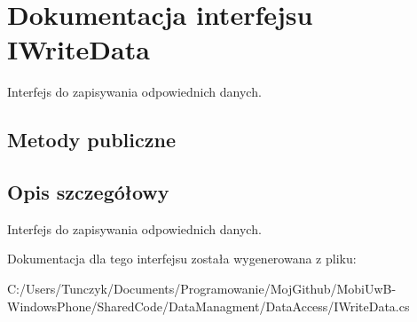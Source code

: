 \hypertarget{a00033}{}\section{Dokumentacja interfejsu I\+Write\+Data}
\label{a00033}


Interfejs do zapisywania odpowiednich danych.  


\subsection*{Metody publiczne}


\subsection{Opis szczegółowy}
Interfejs do zapisywania odpowiednich danych. 



Dokumentacja dla tego interfejsu została wygenerowana z pliku\+:\begin{DoxyCompactItemize}
\item 
C\+:/\+Users/\+Tunczyk/\+Documents/\+Programowanie/\+Moj\+Github/\+Mobi\+Uw\+B-\/\+Windows\+Phone/\+Shared\+Code/\+Data\+Managment/\+Data\+Access/I\+Write\+Data.\+cs\end{DoxyCompactItemize}
